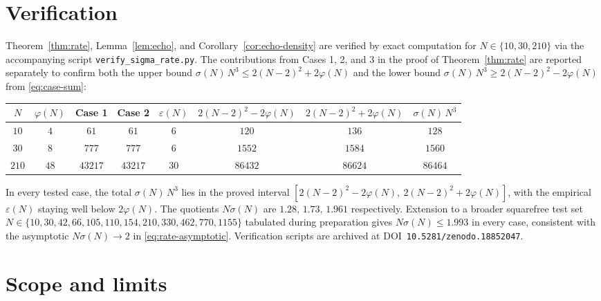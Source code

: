 \documentclass[11pt,reqno]{amsart}
\theoremstyle{plain}
\theoremstyle{definition}
\theoremstyle{remark}
\begin{document}
\section{Verification}\label{sec:verify}

Theorem~\ref{thm:rate}, Lemma~\ref{lem:echo}, and
Corollary~\ref{cor:echo-density} are verified by exact computation
for $N\in\{10,30,210\}$ via the accompanying script
\texttt{verify\_sigma\_rate.py}. The contributions from Cases 1, 2,
and 3 in the proof of Theorem~\ref{thm:rate} are reported separately
to confirm both the upper bound $\sigma(N)\,N^{3}\le 2(N-2)^{2}+2\varphi(N)$
and the lower bound $\sigma(N)\,N^{3}\ge 2(N-2)^{2}-2\varphi(N)$ from
\eqref{eq:case-sum}:

\begin{center}
\begin{tabular}{c|c|c|c|c|c|c|c}
$N$ & $\varphi(N)$ & Case 1 & Case 2 & $\varepsilon(N)$ &
$2(N-2)^{2}-2\varphi(N)$ &
$2(N-2)^{2}+2\varphi(N)$ & $\sigma(N)\,N^{3}$\\
\hline
$10$  & $4$  & $61$    & $61$    & $6$  & $120$    & $136$    & $128$\\
$30$  & $8$  & $777$   & $777$   & $6$  & $1552$   & $1584$   & $1560$\\
$210$ & $48$ & $43217$ & $43217$ & $30$ & $86432$  & $86624$  & $86464$\\
\end{tabular}
\end{center}

In every tested case, the total $\sigma(N)\,N^{3}$ lies in the
proved interval $[2(N-2)^{2}-2\varphi(N),\ 2(N-2)^{2}+2\varphi(N)]$,
with the empirical $\varepsilon(N)$ staying well below
$2\varphi(N)$. The
quotients $N\sigma(N)$ are $1.28,\,1.73,\,1.961$ respectively.
Extension to a broader squarefree test set
$N\in\{10,30,42,66,105,110,154,210,330,462,770,1155\}$ tabulated
during preparation gives $N\sigma(N)\le 1.993$ in every case,
consistent with the asymptotic $N\sigma(N)\to 2$ in
\eqref{eq:rate-asymptotic}. Verification scripts are archived at
DOI~\texttt{10.5281/zenodo.18852047}.

\section{Scope and limits}\label{sec:scope}
\end{document}
